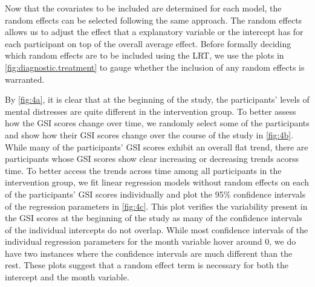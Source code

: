 \noindent Now that the covariates to be included are determined for each model, the random effects can be selected following the same approach. The random effects allows us to adjust the effect that a explanatory variable or the intercept has for each participant on top of the overall average effect. Before formally deciding which random effects are to be included using the LRT, we use the plots in \cref{fig:diagnostic.treatment} to gauge whether the inclusion of any random effects is warranted.\\
\begin{table}
\caption{P values of Likelihood Ratio tests between models with different mixed effects under the intervention group}
\label{tab:model.comp.treatment.me.lrt}
\end{table}
\noindent By \cref{fig:4a}, it is clear that at the beginning of the study, the participants' levels of mental distresses are quite different in the intervention group. To better assess how the GSI scores change over time, we randomly select some of the participants and show how their GSI scores change over the course of the study in \cref{fig:4b}. While many of the participants' GSI scores exhibit an overall flat trend, there are participants whose GSI scores show clear increasing or decreasing trends acorss time. To better access the trends across time among all participants in the intervention group, we fit linear regression models without random effects on each of the participants' GSI scores individually and plot the 95\% confidence intervals of the regression parameters in \cref{fig:4c}. This plot verifies the variability present in the GSI scores at the beginning of the study as many of the confidence intervals of the individual intercepts do not overlap. While most confidence intervals of the individual regression parameters for the month variable hover around 0, we do have two instances where the confidence intervals are much different than the rest. These plots suggest that a random effect term is necessary for both the intercept and the month variable.\\\\
